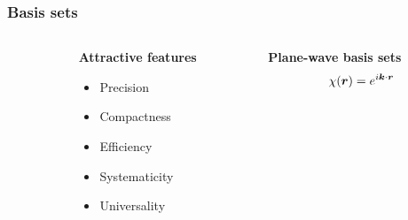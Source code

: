 \begin{frame}
    \frametitle{Basis sets}
    \begin{columns}
    \begin{column}{.10\textwidth}
    \end{column}
    \begin{column}{.30\textwidth}
    \textbf{Attractive features}
    \begin{itemize}
        \item {\color{yellow} Precision}
        \item {\color{yellow} Compactness}
        \item {\color{yellow} Efficiency}
        \item {\color{green} Systematicity}
        \item {\color{yellow} Universality}
    \end{itemize}
    \end{column}
    \begin{column}{.60\textwidth}
    \centering
    \textbf{Plane-wave basis sets}
    \begin{equation}
        \nonumber
        \chi(\boldsymbol r) = e^{i\boldsymbol k\cdot\boldsymbol r}
    \end{equation}
    \end{column}
    \end{columns}

    \vspace{5mm}


\end{frame}

